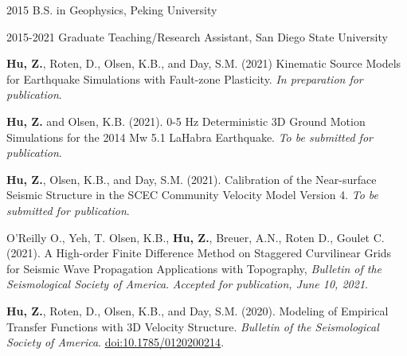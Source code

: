 \begin{frontmatter}
\begin{acknowledgements}
    \end{acknowledgements}


    \begin{vitapage}
        \begin{vita}
            \item[2015] B.S. in Geophysics, Peking University
            \item[2015-2021] Graduate Teaching/Research Assistant, San Diego State University
        \end{vita}
        \begin{publications}
            \item \textbf{Hu, Z.}, Roten, D., Olsen, K.B., and Day, S.M. (2021) Kinematic Source Models for Earthquake Simulations with Fault-zone Plasticity. \emph{In preparation for publication}.
            \item \textbf{Hu, Z.} and Olsen, K.B. (2021). 0-5 Hz Deterministic 3D Ground Motion Simulations for the 2014 Mw 5.1 LaHabra Earthquake. \emph{To be submitted for publication}.
            \item \textbf{Hu, Z.}, Olsen, K.B., and Day, S.M. (2021). Calibration of the Near-surface Seismic Structure in the SCEC Community Velocity Model Version 4. \emph{To be submitted for publication}.
            \item O'Reilly O., Yeh, T. Olsen, K.B., \textbf{Hu, Z.}, Breuer, A.N., Roten D., Goulet C. (2021). A High-order Finite Difference Method on Staggered Curvilinear Grids for Seismic Wave Propagation Applications with Topography, \emph{Bulletin of the Seismological Society of America}. \emph{Accepted for publication, June 10, 2021}.
            \item \textbf{Hu, Z.}, Roten, D., Olsen, K.B., and Day, S.M. (2020). Modeling of Empirical Transfer Functions with 3D Velocity Structure. \emph{Bulletin of the Seismological Society of America}. \url{doi:10.1785/0120200214}.


        \end{publications}
    \end{vitapage}



\end{frontmatter}
